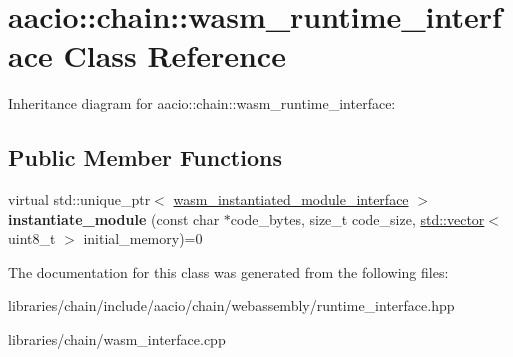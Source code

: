 \hypertarget{classaacio_1_1chain_1_1wasm__runtime__interface}{}\section{aacio\+:\+:chain\+:\+:wasm\+\_\+runtime\+\_\+interface Class Reference}
\label{classaacio_1_1chain_1_1wasm__runtime__interface}


Inheritance diagram for aacio\+:\+:chain\+:\+:wasm\+\_\+runtime\+\_\+interface\+:
\subsection*{Public Member Functions}
\begin{DoxyCompactItemize}
\item 
\mbox{\label{classaacio_1_1chain_1_1wasm__runtime__interface_a1cbf6f33a5dd734273b8a4dd3b8687ba}} 
virtual std\+::unique\+\_\+ptr$<$ \mbox{\hyperlink{classaacio_1_1chain_1_1wasm__instantiated__module__interface}{wasm\+\_\+instantiated\+\_\+module\+\_\+interface}} $>$ {\bfseries instantiate\+\_\+module} (const char $\ast$code\+\_\+bytes, size\+\_\+t code\+\_\+size, \mbox{\hyperlink{classstd_1_1vector}{std\+::vector}}$<$ uint8\+\_\+t $>$ initial\+\_\+memory)=0
\end{DoxyCompactItemize}


The documentation for this class was generated from the following files\+:\begin{DoxyCompactItemize}
\item 
libraries/chain/include/aacio/chain/webassembly/runtime\+\_\+interface.\+hpp\item 
libraries/chain/wasm\+\_\+interface.\+cpp\end{DoxyCompactItemize}
